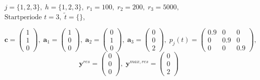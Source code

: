 \begin{center}
$j = \{1, 2, 3\}, \; h = \{1,2,3\}, \; r_{1} = 100, \; r_{2} = 200, \; r_{3} = 5000,$ \\
$\text{Startperiode } t=3, \; \tilde{t}=\{\} $,
\end{center}
\[
    \textbf{c}=\begin{pmatrix} 1\\ 1\\ 0  \end{pmatrix}, \;
    \textbf{a}_{1}=\begin{pmatrix} 1\\ 0\\ 0  \end{pmatrix}, \;
     \textbf{a}_{2}=\begin{pmatrix} 0\\ 1\\ 0  \end{pmatrix}, \;
       \textbf{a}_{3}=\begin{pmatrix} 0\\ 0\\ 2  \end{pmatrix}, \;
            p_{j}(t)=
       \begin{pmatrix}
       0.9 & 0 & 0 \\
0 & 0.9 & 0 \\
0 & 0 & 0.9
\end{pmatrix}, 
  \]
  \[
    \textbf{y}^{res}= \begin{pmatrix} 0\\ 0\\ 0  \end{pmatrix}, \;
    \textbf{y}^{max,res}=\begin{pmatrix} 0\\ 0\\ 2  \end{pmatrix}
      \]

